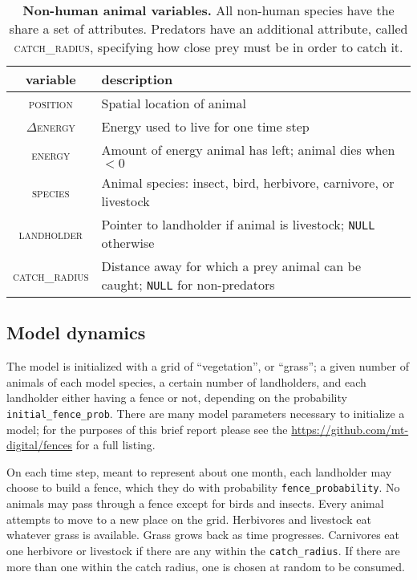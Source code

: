 \documentclass{article}
\begin{document}
\begin{table}[h]
  \caption{\textbf{Non-human animal variables.} All non-human species have
  the share a set of attributes. Predators have an additional attribute, called
\textsc{catch\_radius}, specifying how close prey must be in order to catch it.}

  \label{tab:nonhuman}
  \begin{tabular}{cl} \toprule
    variable & description \\ \midrule  
    \textsc{position} & Spatial location of animal \\
    $\Delta$\textsc{energy} & Energy used to live for one time step \\
    \textsc{energy} & Amount of energy animal has left; animal dies when $<0$ \\
    \textsc{species} & Animal species: insect, bird, herbivore, carnivore, or
    livestock \\
    \textsc{landholder} & Pointer to landholder if animal is livestock; \texttt{NULL}
    otherwise \\
    \textsc{catch\_radius} & Distance away for which a prey animal can be caught; \texttt{NULL} for non-predators  \\
    \bottomrule
  \end{tabular} 
\end{table}

\subsection{Model dynamics}

The model is initialized with a grid of
``vegetation'', or ``grass''; a given number of animals of each model
species, a certain number of landholders, and each landholder either having
a fence or not, depending on the probability \texttt{initial\_fence\_prob}.
There are many model parameters necessary to initialize a model; for the
purposes of this brief report please see the \href{model initialization code
on GitHub}{https://github.com/mt-digital/fences} for a full listing.  

On each time step, meant to represent about one month, 
each landholder may choose to build a fence, which they do with
probability \texttt{fence\_probability}. No animals may pass through a
fence except for birds and insects. 
Every animal attempts to move to a new place on the grid.
Herbivores and livestock eat whatever grass is available. Grass grows back as
time progresses. Carnivores eat
one herbivore or livestock if there are any within the
\texttt{catch\_radius}. If there are more than one within the catch
radius, one is chosen at random to be consumed. 
\end{document}
